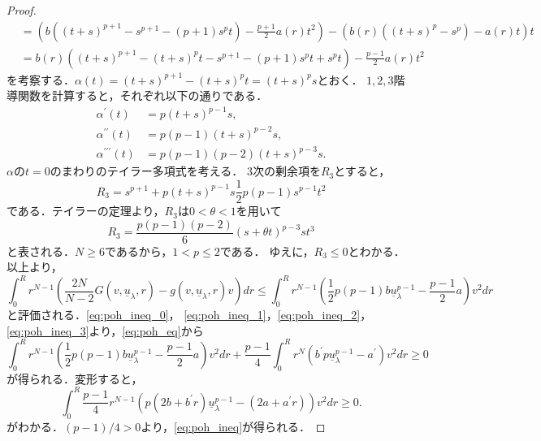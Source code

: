 \begin{proof}
\begin{align*}
  &= \left( b \left( (t+s)^{p+1} - s^{p+1} - (p+1)s^p t \right) -
  \frac{p+1}{2} a(r) t^2 \right) - \left( b(r) \left( (t+s)^p - s^p
  \right) - a(r) t \right) t \\
  &= b(r) \left( (t+s)^{p+1} - (t+s)^p t - s^{p+1} - (p+1)s^p t + s^p
  t \right) -\frac{p-1}{2} a(r) t^2
 \end{align*}
 を考察する．$\alpha(t) = (t+s)^{p+1} - (t+s)^p t = (t+s)^p s$とおく．
 $1, 2, 3$階導関数を計算すると，それぞれ以下の通りである．
 \begin{align*}
  \alpha^\prime(t) &= p(t+s)^{p-1}s, \\
  \alpha^{\prime\prime}(t) &= p(p-1)(t+s)^{p-2}s, \\
  \alpha^{\prime\prime\prime}(t) &= p(p-1)(p-2)(t+s)^{p-3}s.
 \end{align*}
 $\alpha$の$t = 0$のまわりのテイラー多項式を考える．
 $3$次の剰余項を$R_3$とすると，
 \[
  R_3 = s^{p+1} + p(t+s)^{p-1} s \frac{1}{2}p(p-1)s^{p-1}t^2
 \]
 である．テイラーの定理より，$R_3$は$0 < \theta < 1$を用いて
 \[
  R_3 = \frac{p(p-1)(p-2)}{6}(s + \theta t)^{p-3} st^3
 \]
 と表される．$N \geq 6$であるから，$1 < p \leq 2$である．
 ゆえに，$R_3 \leq 0$とわかる．以上より，
 \begin{equation}
  \int_0^R r^{N-1} \left( \frac{2N}{N-2} G(v, \underline{u}_\lambda,
           r) - g(v, \underline{u}_\lambda, r) v \right) dr \leq \int_0^R
  r^{N-1} \left( \frac{1}{2} p(p-1) b\underline{u}_\lambda^{p-1} -
 \frac{p-1}{2} a  \right) v^2 dr \label{eq:poh_ineq_3}
 \end{equation}
 と評価される．\eqref{eq:poh_ineq_0}，
 \eqref{eq:poh_ineq_1}，\eqref{eq:poh_ineq_2}，
 \eqref{eq:poh_ineq_3}より，\eqref{eq:poh_eq}から
 \[
  \int_0^R r^{N-1} \left( \frac{1}{2} p(p-1) b
 \underline{u}_\lambda^{p-1} - \frac{p-1}{2} a \right) v^2 dr 
 + \frac{p-1}{4} \int_0^R r^N \left( b^\prime p
 \underline{u}_\lambda^{p-1} - a^\prime \right) v^2 dr \geq 0
 \]
 が得られる．変形すると，
 \[
  \int_0^R \frac{p-1}{4}  r^{N-1} \left( p(2b + b^\prime r)
 \underline{u}_\lambda^{p-1} 
 - (2a + a^\prime r) \right) v^2 dr \geq 0.
 \]
 がわかる．$(p-1)/4 > 0$より，\eqref{eq:poh_ineq}が得られる．\qedhere
\end{proof}

